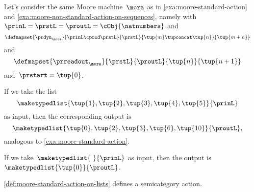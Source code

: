 \begin{example}
    \label{exa:moore-non-standard-action-on-lists}
    Let's consider the same Moore machine~$\mora$ as in \cref{exa:moore-standard-action} and \cref{exa:moore-non-standard-action-on-sequences}, namely with~$\prinL = \prstL = \proutL = \cObj{\natnumbers}$
    and
    \begin{equation}
        \defmapset{
            \prdyn_\mora
        }{
            \prinL \cprod \prstL
        }{
            \prstL
        }{
            \tup{m} \tupconcat \tup{n}
        }{
            \tup{m + n}
        }
    \end{equation}
    and
    \begin{equation}
        \defmapset{
            \prreadout_\mora
        }{
            \prstL
        }{
            \proutL
        }{
            \tup{n}
        }{
            \tup{n+1}
        }
    \end{equation}
    and~$\prstart = \tup{0}$.

    If we take the list
    \begin{equation*}
        \maketypedlist{\tup{1}, \tup{2}, \tup{3}, \tup{4}, \tup{5}}{\prinL}
    \end{equation*}
    as input, then the corresponding output is
    \begin{equation*}
        \maketypedlist{\tup{0}, \tup{2}, \tup{3}, \tup{6}, \tup{10}}{\proutL},
    \end{equation*}
    analogous to \cref{exa:moore-standard-action}.

    If we take~$\maketypedlist{\ }{\prinL}$ as input, then the output is~$\maketypedlist{\tup{0}}{\proutL}$.
\end{example}


\begin{lemma}
    \cref{def:moore-standard-action-on-lists} defines a semicategory action.
\end{lemma}

